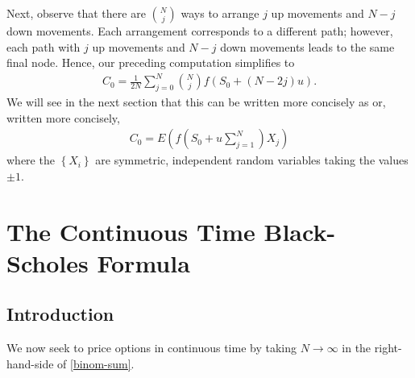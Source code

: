 \documentclass[12pt]{amsbook}
\theoremstyle{plain}
\theoremstyle{definition}
\theoremstyle{remark}
\numberwithin{equation}{section}  %
\begin{document}
Next, observe that there are $\binom{N}{j}$ ways to arrange $j$ up movements and
$N-j$ down movements. Each arrangement corresponds to a different path; however,
each path with $j$ up movements and $N-j$ down movements leads to the same final
node. Hence, our preceding computation simplifies to
\begin{equation}\label{binom-sum}
	\begin{split}
		C_{0} = 	\frac{1}{2N} \sum_{j = 0}^{N} {\binom{N}{j}}f(S_{0} + (N-2j)u).
	\end{split}
\end{equation}
We will see in the next section that this can be written more concisely as
or, written more concisely,
\begin{equation}
	\begin{split}
		C_{0} =  E(f(S_{0} + u \sum_{j=1}^{N})X_{j})	
	\end{split}
\end{equation}
where the $\left\{ X_{i} \right\}$ are symmetric, independent random 
variables taking the values $\pm 1$.
\chapter{The Continuous Time Black-Scholes Formula}
\section{Introduction}
We now seek to price options in continuous time 
by taking $N \to \infty$ in the right-hand-side of \eqref{binom-sum}.
\end{document}
